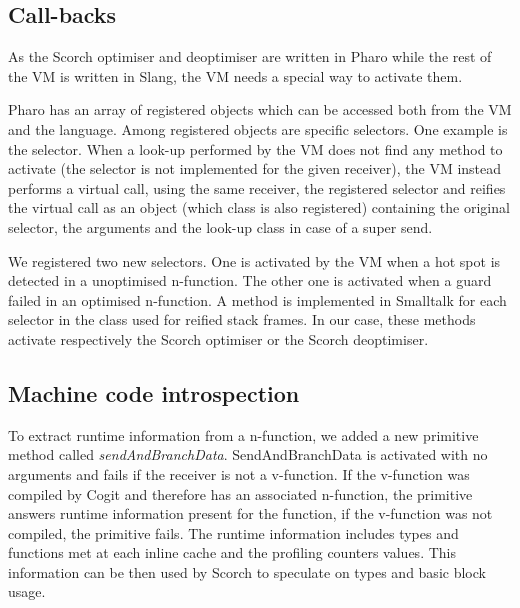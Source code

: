 \documentclass[a4paper,12pt,twoside]{../includes/ThesisStyle}
\begin{document}

\subsection{Call-backs}

As the Scorch optimiser and deoptimiser are written in Pharo while the rest of the VM is written in Slang, the VM needs a special way to activate them. 

Pharo has an array of registered objects which can be accessed both from the VM and the language. Among registered objects are specific selectors. One example is the  selector. When a look-up performed by the VM does not find any method to activate (the selector is not implemented for the given receiver), the VM instead performs a virtual call, using the same receiver, the registered  selector and reifies the virtual call as an object (which class is also registered) containing the original selector, the arguments and the look-up class in case of a super send. 

We registered two new selectors. One is activated by the VM when a hot spot is detected in a unoptimised n-function. The other one is activated when a guard failed in an optimised n-function. A method is implemented in Smalltalk for each selector in the class used for reified stack frames. In our case, these methods activate respectively the Scorch optimiser or the Scorch deoptimiser.

\subsection{Machine code introspection}

To extract runtime information from a n-function, we added a new primitive method called \emph{sendAndBranchData}. SendAndBranchData is activated with no arguments and fails if the receiver is not a v-function. If the v-function was compiled by Cogit and therefore has an associated n-function, the primitive answers runtime information present for the function, if the v-function was not compiled, the primitive fails. The runtime information includes types and functions met at each inline cache and the profiling counters values. This information can be then used by Scorch to speculate on types and basic block usage. 
\end{document}
